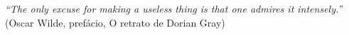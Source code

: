 


\begin{epigrafe}

\textit{``The only excuse for making a useless thing is that one admires it intensely.''}
(Oscar Wilde, prefácio, O retrato de Dorian Gray)
\end{epigrafe}



